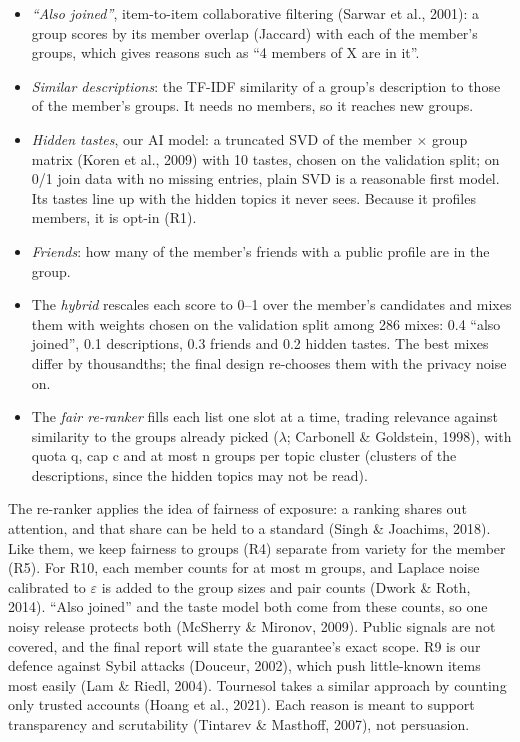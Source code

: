 \documentclass[11pt,letterpaper]{article}
\begin{document}
\begin{itemize}
\item \textit{``Also joined''}, item-to-item collaborative filtering (Sarwar et al., 2001): a group scores by
its member overlap (Jaccard) with each of the member's groups, which gives reasons such as ``4 members of X
are in it''.
\item \textit{Similar descriptions}: the TF-IDF similarity of a group's description to those of the member's
groups. It needs no members, so it reaches new groups.
\item \textit{Hidden tastes}, our AI model: a truncated SVD of the member $\times$ group matrix (Koren et al.,
2009) with 10 tastes, chosen on the validation split; on 0/1 join data with no missing entries, plain SVD is a
reasonable first model. Its tastes line up with the hidden topics it never sees. Because it profiles members,
it is opt-in (R1).
\item \textit{Friends}: how many of the member's friends with a public profile are in the group.
\item The \textit{hybrid} rescales each score to 0--1 over the member's candidates and mixes them with weights
chosen on the validation split among 286 mixes: 0.4 ``also joined'', 0.1 descriptions, 0.3 friends and 0.2
hidden tastes. The best mixes differ by thousandths; the final design re-chooses them with the privacy noise
on.
\item The \textit{fair re-ranker} fills each list one slot at a time, trading relevance against similarity to
the groups already picked ($\lambda$; Carbonell \& Goldstein, 1998), with quota q, cap c and at most n groups
per topic cluster (clusters of the descriptions, since the hidden topics may not be read).
\end{itemize}

The re-ranker applies the idea of fairness of exposure: a ranking shares out attention, and that share can be
held to a standard (Singh \& Joachims, 2018). Like them, we keep fairness to groups (R4) separate from variety
for the member (R5). For R10, each member counts for at most m groups, and Laplace noise calibrated to
$\varepsilon$ is added to the group sizes and pair counts (Dwork \& Roth, 2014). ``Also joined'' and the taste
model both come from these counts, so one noisy release protects both (McSherry \& Mironov, 2009). Public
signals are not covered, and the final report will state the guarantee's exact scope. R9 is our defence
against Sybil attacks (Douceur, 2002), which push little-known items most easily (Lam \& Riedl, 2004).
Tournesol takes a similar approach by counting only trusted accounts (Hoang et al., 2021). Each reason is
meant to support transparency and scrutability (Tintarev \& Masthoff, 2007), not persuasion.
\end{document}
